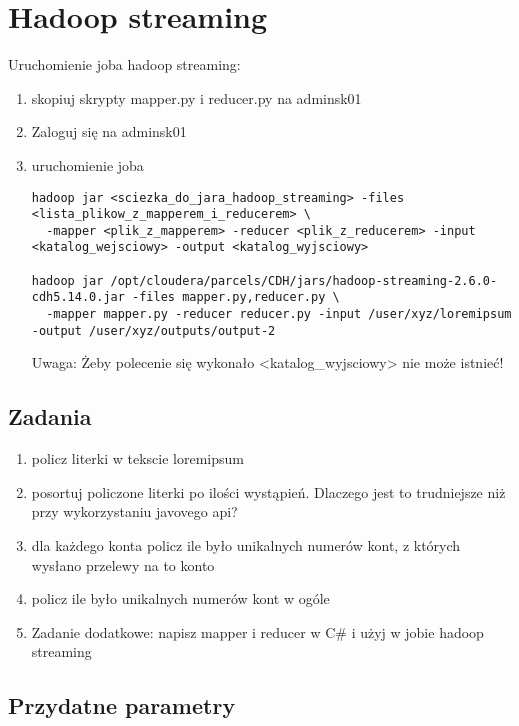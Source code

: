 \documentclass{article}
\begin{document}
\section*{Hadoop streaming}

Uruchomienie joba hadoop streaming:
\begin{enumerate}
\item skopiuj skrypty mapper.py i reducer.py na adminsk01
\item Zaloguj się na adminsk01
\item uruchomienie joba
\begin{lstlisting}[]
hadoop jar <sciezka_do_jara_hadoop_streaming> -files <lista_plikow_z_mapperem_i_reducerem> \
  -mapper <plik_z_mapperem> -reducer <plik_z_reducerem> -input <katalog_wejsciowy> -output <katalog_wyjsciowy>

hadoop jar /opt/cloudera/parcels/CDH/jars/hadoop-streaming-2.6.0-cdh5.14.0.jar -files mapper.py,reducer.py \
  -mapper mapper.py -reducer reducer.py -input /user/xyz/loremipsum -output /user/xyz/outputs/output-2
\end{lstlisting}

Uwaga: Żeby polecenie się wykonało <katalog\_wyjsciowy> nie może istnieć!
\end{enumerate}

\subsection*{Zadania}

\begin{enumerate}
\item policz literki w tekscie loremipsum
\item posortuj policzone literki po ilości wystąpień. Dlaczego jest to trudniejsze niż przy wykorzystaniu javovego api?
\item dla każdego konta policz ile było unikalnych numerów kont, z których wysłano przelewy na to konto
\item policz ile było unikalnych numerów kont w ogóle
\item Zadanie dodatkowe: napisz mapper i reducer w C\# i użyj w jobie hadoop streaming 
\end{enumerate}

\subsection*{Przydatne parametry}
\end{document}
